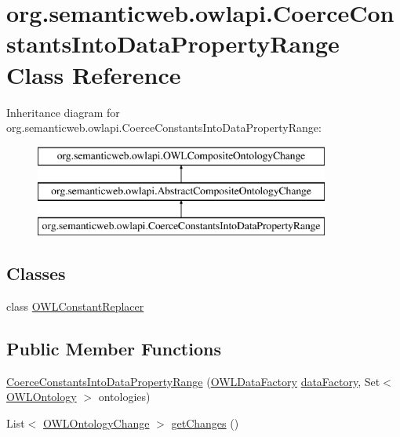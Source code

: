 \hypertarget{classorg_1_1semanticweb_1_1owlapi_1_1_coerce_constants_into_data_property_range}{\section{org.\-semanticweb.\-owlapi.\-Coerce\-Constants\-Into\-Data\-Property\-Range Class Reference}
\label{classorg_1_1semanticweb_1_1owlapi_1_1_coerce_constants_into_data_property_range}
}
Inheritance diagram for org.\-semanticweb.\-owlapi.\-Coerce\-Constants\-Into\-Data\-Property\-Range\-:\begin{figure}[H]
\begin{center}
\leavevmode
\includegraphics[height=3.000000cm]{classorg_1_1semanticweb_1_1owlapi_1_1_coerce_constants_into_data_property_range}
\end{center}
\end{figure}
\subsection*{Classes}
\begin{DoxyCompactItemize}
\item 
class \hyperlink{classorg_1_1semanticweb_1_1owlapi_1_1_coerce_constants_into_data_property_range_1_1_o_w_l_constant_replacer}{O\-W\-L\-Constant\-Replacer}
\end{DoxyCompactItemize}
\subsection*{Public Member Functions}
\begin{DoxyCompactItemize}
\item 
\hyperlink{classorg_1_1semanticweb_1_1owlapi_1_1_coerce_constants_into_data_property_range_aef492129834cfd797fdaafc7405fff97}{Coerce\-Constants\-Into\-Data\-Property\-Range} (\hyperlink{interfaceorg_1_1semanticweb_1_1owlapi_1_1model_1_1_o_w_l_data_factory}{O\-W\-L\-Data\-Factory} \hyperlink{classorg_1_1semanticweb_1_1owlapi_1_1_abstract_composite_ontology_change_aebcfd0601543ebb5f72b1fe53a5352c9}{data\-Factory}, Set$<$ \hyperlink{interfaceorg_1_1semanticweb_1_1owlapi_1_1model_1_1_o_w_l_ontology}{O\-W\-L\-Ontology} $>$ ontologies)
\item 
List$<$ \hyperlink{classorg_1_1semanticweb_1_1owlapi_1_1model_1_1_o_w_l_ontology_change}{O\-W\-L\-Ontology\-Change} $>$ \hyperlink{classorg_1_1semanticweb_1_1owlapi_1_1_coerce_constants_into_data_property_range_ab1e563bd192619dbf7848b001eafa9f7}{get\-Changes} ()
\end{DoxyCompactItemize}
